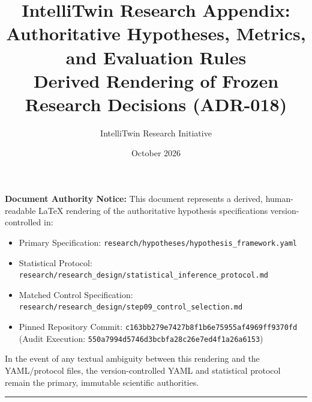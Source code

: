 \documentclass[11pt,a4paper]{article}
\title{\textbf{IntelliTwin Research Appendix: Authoritative Hypotheses, Metrics, and Evaluation Rules}\\
\large Derived Rendering of Frozen Research Decisions (ADR-018)\\}
\author{IntelliTwin Research Initiative}
\date{October 2026}
\begin{document}
\maketitle

\noindent\textbf{Document Authority Notice:} This document represents a derived, human-readable LaTeX rendering of the authoritative hypothesis specifications version-controlled in:
\begin{itemize}[noitemsep]
  \item Primary Specification: \texttt{research/hypotheses/hypothesis\_framework.yaml}
  \item Statistical Protocol: \texttt{research/research\_design/statistical\_inference\_protocol.md}
  \item Matched Control Specification: \texttt{research/research\_design/step09\_control\_selection.md}
  \item Pinned Repository Commit: \texttt{c163bb279e7427b8f1b6e75955af4969ff9370fd} (Audit Execution: \texttt{550a7994d5746d3bcbfa28c26e7ed4f1a26a6153})
\end{itemize}
In the event of any textual ambiguity between this rendering and the YAML/protocol files, the version-controlled YAML and statistical protocol remain the primary, immutable scientific authorities.

\vspace{0.5em}
\hrule
\vspace{1em}


\end{document}
